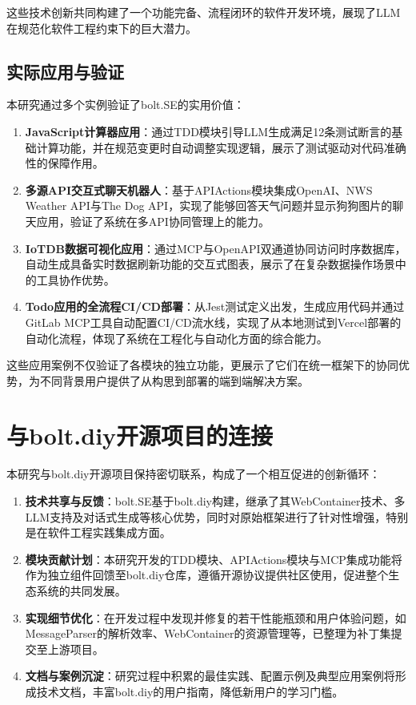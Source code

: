 这些技术创新共同构建了一个功能完备、流程闭环的软件开发环境，展现了LLM在规范化软件工程约束下的巨大潜力。

\subsection{实际应用与验证}

本研究通过多个实例验证了bolt.SE的实用价值：

\begin{enumerate}
  \item \textbf{JavaScript计算器应用}：通过TDD模块引导LLM生成满足12条测试断言的基础计算功能，并在规范变更时自动调整实现逻辑，展示了测试驱动对代码准确性的保障作用。
  
  \item \textbf{多源API交互式聊天机器人}：基于APIActions模块集成OpenAI、NWS Weather API与The Dog API，实现了能够回答天气问题并显示狗狗图片的聊天应用，验证了系统在多API协同管理上的能力。
  
  \item \textbf{IoTDB数据可视化应用}：通过MCP与OpenAPI双通道协同访问时序数据库，自动生成具备实时数据刷新功能的交互式图表，展示了在复杂数据操作场景中的工具协作优势。
  
  \item \textbf{Todo应用的全流程CI/CD部署}：从Jest测试定义出发，生成应用代码并通过GitLab MCP工具自动配置CI/CD流水线，实现了从本地测试到Vercel部署的自动化流程，体现了系统在工程化与自动化方面的综合能力。
\end{enumerate}

这些应用案例不仅验证了各模块的独立功能，更展示了它们在统一框架下的协同优势，为不同背景用户提供了从构思到部署的端到端解决方案。

\section{与bolt.diy开源项目的连接}

本研究与bolt.diy开源项目保持密切联系，构成了一个相互促进的创新循环：

\begin{enumerate}
  \item \textbf{技术共享与反馈}：bolt.SE基于bolt.diy构建，继承了其WebContainer技术、多LLM支持及对话式生成等核心优势，同时对原始框架进行了针对性增强，特别是在软件工程实践集成方面。
  
  \item \textbf{模块贡献计划}：本研究开发的TDD模块、APIActions模块与MCP集成功能将作为独立组件回馈至bolt.diy仓库，遵循开源协议提供社区使用，促进整个生态系统的共同发展。
  
  \item \textbf{实现细节优化}：在开发过程中发现并修复的若干性能瓶颈和用户体验问题，如MessageParser的解析效率、WebContainer的资源管理等，已整理为补丁集提交至上游项目。
  
  \item \textbf{文档与案例沉淀}：研究过程中积累的最佳实践、配置示例及典型应用案例将形成技术文档，丰富bolt.diy的用户指南，降低新用户的学习门槛。
\end{enumerate}

